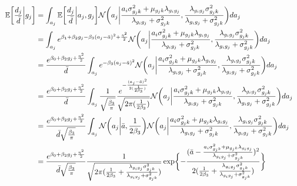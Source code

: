 \documentclass[12pt]{article}
\begin{document}
\begin{align}
\ex\biggl[ \frac{d_j}{\bar{d}} \biggl| g_j \biggr] 
&= \int_{a_j}  \ex\biggl[ \frac{d_j}{\bar{d}} \biggl| a_j, g_j \biggr] 
\normal \biggl(a_j \biggl| \frac{a_i \sigma_{g_jk}^2 + \mu_{g_jk} \lambda_{g_ig_j}}{\lambda_{g_ig_j} + \sigma_{g_jk}^2}, \frac{\lambda_{g_ig_j} \sigma_{g_jk}^2}{\lambda_{g_ig_j} + \sigma_{g_jk}^2} \biggr) da_j 
&& \\\nonumber
&= \int_{a_j} e^{ \beta_1 + \beta_2 g_j - \beta_3 (a_j - \bar{a})^2 + \frac{\eta^2}{2} } 
\normal \biggl(a_j \biggl| \frac{a_i \sigma_{g_jk}^2 + \mu_{g_jk} \lambda_{g_ig_j}}{\lambda_{g_ig_j} + \sigma_{g_jk}^2}, \frac{\lambda_{g_ig_j} \sigma_{g_jk}^2}{\lambda_{g_ig_j} + \sigma_{g_jk}^2} \biggr) da_j
 && \\\nonumber
&= \frac{ e^{ \beta_0 + \beta_2 g_j + \frac{\eta^2}{2} } }{ \bar{d} }
\int_{a_j} e^{- \beta_3 (a_j - \bar{a})^2} 
\normal \biggl(a_j \biggl| \frac{a_i \sigma_{g_jk}^2 + \mu_{g_jk} \lambda_{g_ig_j}}{\lambda_{g_ig_j} + \sigma_{g_jk}^2}, \frac{\lambda_{g_ig_j} \sigma_{g_jk}^2}{\lambda_{g_ig_j} + \sigma_{g_jk}^2} \biggr) da_j 
&& \\\nonumber
&= \frac{ e^{ \beta_0 + \beta_2 g_j + \frac{\eta^2}{2} } }{ \bar{d} }
\int_{a_j} \frac{ 1 }{ \sqrt{ \frac{\beta_3}{\pi} } }
\frac{ e^{- \frac{ (a_j - \bar{a})^2 }{ 2 ( \frac{1}{2\beta_3} ) } } }{ \sqrt{ 2 \pi (\frac{1}{2\beta_3}) } }
\normal \biggl(a_j \biggl| \frac{a_i \sigma_{g_jk}^2 + \mu_{g_jk} \lambda_{g_ig_j}}{\lambda_{g_ig_j} + \sigma_{g_jk}^2}, \frac{\lambda_{g_ig_j} \sigma_{g_jk}^2}{\lambda_{g_ig_j} + \sigma_{g_jk}^2} \biggr) da_j 
&& \\\nonumber
&= \frac{ e^{ \beta_0 + \beta_2 g_j + \frac{\eta^2}{2} } }{ \bar{d} \sqrt{ \frac{\beta_3}{\pi} } }
\int_{a_j} \normal \biggl(a_j \biggl| \bar{a}, \frac{1}{2\beta_3} \biggr)
\normal \biggl(a_j \biggl| \frac{a_i \sigma_{g_jk}^2 + \mu_{g_jk} \lambda_{g_ig_j}}{\lambda_{g_ig_j} + \sigma_{g_jk}^2}, \frac{\lambda_{g_ig_j} \sigma_{g_jk}^2}{\lambda_{g_ig_j} + \sigma_{g_jk}^2} \biggr) da_j 
&& \\\nonumber
&= \frac{ e^{ \beta_0 + \beta_2 g_j + \frac{\eta^2}{2} } }{ \bar{d} \sqrt{ \frac{\beta_3}{\pi} } }
\frac{1}{ \sqrt{ 2 \pi ( \frac{1}{2\beta_3} + \frac{\lambda_{g_ig_j} \sigma_{g_jk}^2}{\lambda_{g_ig_j} + \sigma_{g_jk}^2} ) } }
\exp\biggl\{ -\frac{ ( \bar{a} - \frac{a_i \sigma_{g_jk}^2 + \mu_{g_jk} \lambda_{g_ig_j}}{\lambda_{g_ig_j} + \sigma_{g_jk}^2} )^2 }{ 2 ( \frac{1}{2\beta_3} + \frac{\lambda_{g_ig_j} \sigma_{g_jk}^2}{\lambda_{g_ig_j} + \sigma_{g_jk}^2} ) } \biggr\}
&& \\\nonumber

\end{align}
\end{document}
